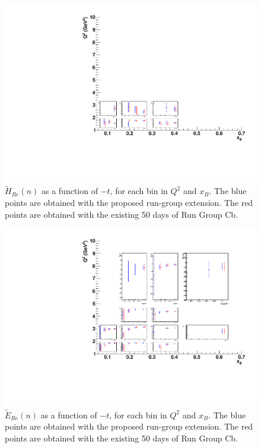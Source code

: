 \begin{figure}  
\begin{center}
\includegraphics[width=200mm]{mixed_CFF/100/mixed/CFF_htre_compare3.pdf}
\caption[$\tilde{H}_{Re}(n)$ as a function of $-t$]
{$\tilde{H}_{Re}(n)$ as a function of $-t$, for each bin in $Q^2$ and $x_B$. The blue points are obtained with the proposed run-group extension. The red points are obtained with the existing 50 days of Run Group Cb.}\label{cff_htre}
\end{center}
\end{figure}

\begin{figure}  
\begin{center}
\includegraphics[width=200mm]{mixed_CFF/100/mixed/CFF_etre_compare3.pdf}
\caption[$\tilde{E}_{Re}(n)$ as a function of $-t$]
{$\tilde{E}_{Re}(n)$ as a function of $-t$, for each bin in $Q^2$ and $x_B$. The blue points are obtained with the proposed run-group extension. The red points are obtained with the existing 50 days of Run Group Cb.}\label{cff_etre}
\end{center}
\end{figure}


